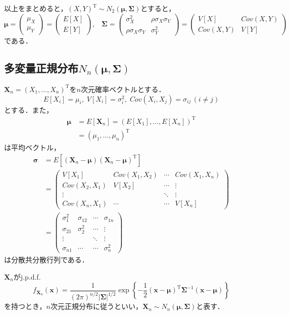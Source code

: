 \documentclass{jsreport}
\begin{document}
以上をまとめると，$(X, Y)^{\mathrm{T}} \sim N_2(\bm{\mu}, \bm{\Sigma})$とすると，
\begin{equation}
  \bm{\mu} = \left(
  \begin{array}{c}
    \mu_X \\
    \mu_Y
  \end{array}
  \right) = \left(
  \begin{array}{c}
    E[X] \\
    E[Y]
  \end{array}
  \right), \; \; \;
  \bm{\Sigma} = \left(
  \begin{array}{cc}
    \sigma_X^2 & \rho \sigma_X \sigma_Y \\
    \rho \sigma_X \sigma_Y & \sigma_Y^2
  \end{array}
  \right) = \left(
  \begin{array}{cc}
    V[X] & Cov(X, Y) \\
    Cov(X, Y) & V[Y]
  \end{array}
  \right) \nonumber
\end{equation}
である．

\subsection{多変量正規分布$N_n(\bm{\mu}, \bm{\Sigma})$}
$\bm{X}_n = (X_1, \ldots, X_n)^{\mathrm{T}}$を$n$次元確率ベクトルとする．
\begin{equation}
  E[X_i] = \mu_i, \; V[X_i] = \sigma_i^2, \; Cov(X_i, X_j) = \sigma_{ij} \, (i \neq j) \nonumber
\end{equation}
とする．また，
\begin{align}
  \bm{\mu} &= E[\bm{X}_n] = (E[X_1], \ldots, E[X_n])^{\mathrm{T}} \nonumber \\
  &= (\mu_1, \ldots, \mu_n)^{\mathrm{T}} \nonumber
\end{align}
は平均ベクトル，
\begin{align}
  \bm{\sigma} &= E[(\bm{X}_n - \bm{\mu})(\bm{X}_n - \bm{\mu})^{\mathrm{T}}] \nonumber \\
  &= \left(
  \begin{array}{cccc}
    V[X_1] & Cov(X_1, X_2) & \cdots & Cov(X_1, X_n) \\
    Cov(X_2, X_1) & V[X_2] & \cdots & \vdots \\
    \vdots & & \ddots & \vdots \\
    Cov(X_n, X_1) & \cdots & \cdots & V[X_n]
  \end{array}
  \right) \nonumber \\
  &= \left(
  \begin{array}{cccc}
    \sigma_1^2 & \sigma_{12} & \cdots & \sigma_{1n} \\
    \sigma_{21} & \sigma_2^2 & \cdots & \vdots \\
    \vdots & & \ddots & \vdots \\
    \sigma_{n1} & \cdots & \cdots & \sigma_n^2
  \end{array}
  \right) \nonumber
\end{align}
は分散共分散行列である．

$\bm{X}_n$がj.p.d.f.
\begin{equation}
  f_{\bm{X}_n}(\bm{x}) = \frac{1}{(2\pi)^{n/2} |\bm{\Sigma}|^{1/2}} \exp\left\{-\frac{1}{2} (\bm{x} - \bm{\mu})^{\mathrm{T}} \bm{\Sigma}^{-1} (\bm{x}-\bm{\mu})\right\} \nonumber
\end{equation}
を持つとき，$n$次元正規分布に従うといい，$\bm{X}_n \sim N_n(\bm{\mu}, \bm{\Sigma})$と表す．
\end{document}
